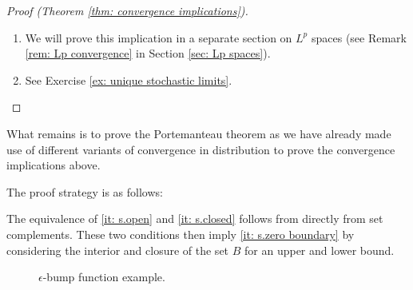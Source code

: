 \begin{proof}[Proof (Theorem \ref{thm: convergence implications})]
\begin{enumerate}[wide=0pt]
        

        \item[\ref{it: Lq to Lp}] We will prove this implication in a separate
        section on \(L^p\) spaces (see Remark \ref{rem: Lp convergence} in
        Section \ref{sec: Lp spaces}).

        \item[\ref{it: uniqueness of limits}] See Exercise \ref{ex: unique stochastic limits}.
        \qedhere
    \end{enumerate}
\end{proof}

What remains is to prove the Portemanteau theorem as we have already made
use of different variants of convergence in distribution to prove the convergence
implications above.

\begin{myproof}
    The proof strategy is as follows:
    \begin{center}
        
    \end{center}
    The equivalence of \ref{it: s.open} and \ref{it: s.closed} follows from
    directly from set complements. These two conditions then imply \ref{it: s.zero boundary}
    by considering the interior and closure of the set \(B\) for an upper and lower
    bound.


    \begin{figure}
        \scalebox{0.7}{
        
        }
        \caption{
            \(\epsilon\)-bump function example.
        }
    \end{figure}
    

\end{myproof}
